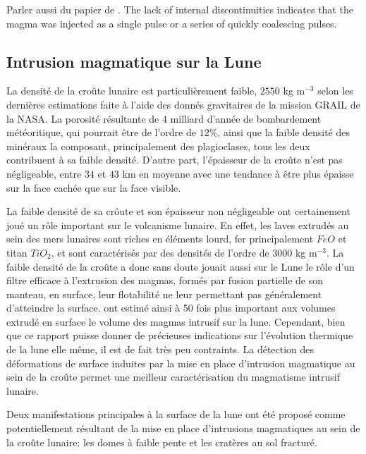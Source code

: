 Parler aussi du papier de \citep{Roni:2014gt}. The lack of internal discontinuities indicates that the magma was injected as a single pulse or a series of quickly coalescing pulses.
\subsection{Intrusion magmatique sur la Lune}
\label{sec:moon}

La densité de la croûte lunaire est particulièrement faible, $2550$ kg
m$^{-3}$ selon  les dernières  estimations faite  à l'aide  des donnés
gravitaires de  la mission GRAIL de  la NASA\citep{Wieczorek:2013ipa}.
La  porosité   résultante  de  4  milliard   d'année  de  bombardement
météoritique, qui  pourrait être  de l'ordre de  $12\%$, ainsi  que la
faible  densité   des  minéraux   la  composant,   principalement  des
plagioclases, tous les  deux contribuent à sa  faible densité. D'autre
part, l'épaisseur  de la croûte  n'est pas négligeable, entre  $34$ et
$43$ km en moyenne  avec une tendance à être plus  épaisse sur la face
cachée que sur la face visible.

La faible  densité de sa crôute  et son épaisseur non  négligeable ont
certainement joué  un rôle  important sur  le volcanisme  lunaire.  En
effet, les  laves extrudés au  sein des  mers lunaires sont  riches en
éléments lourd,  fer principalement  $FeO$ et  titan $TiO_2$,  et sont
caractérisés par  des densités  de l'ordre de  $3000$ kg  m$^{-3}$. La
faible densité de la croûte a donc sans doute jouait aussi sur le Lune
le  rôle d'un  filtre efficace  à l'extrusion  des magmas,  formés par
fusion partielle de son manteau,  en surface, leur flotabilité ne leur
permettant        pas        généralement        d'atteindre        la
surface. \citet{Head:1992bk} ont estimé ainsi à 50 fois plus important
aux volumes  extrudé en surface le  volume des magmas intrusif  sur la
lune.   Cependant, bien  que ce  rapport puisse  donner de  précieuses
indications sur l'évolution thermique de la  lune elle même, il est de
fait très  peu contraints.  La  détection des déformations  de surface
induites par  la mise en  place d'intrusion  magmatique au sein  de la
croûte  permet une  meilleur  caractérisation  du magmatisme  intrusif
lunaire.

Deux  manifestations principales  à  la  surface de  la  lune ont  été
proposé  comme   potentiellement  résultant   de  la  mise   en  place
d'intrusions magmatiques  au sein  de la croûte  lunaire: les  domes à
faible pente et les cratères au sol fracturé.

